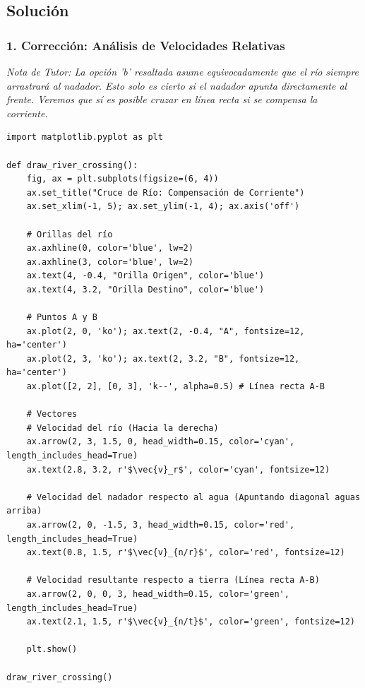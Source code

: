 \documentclass[12pt, a4paper]{article}
\begin{document}
\subsection*{Solución}

\subsubsection*{1. Corrección: Análisis de Velocidades Relativas}
\textit{Nota de Tutor: La opción 'b' resaltada asume equivocadamente que el río siempre arrastrará al nadador. Esto solo es cierto si el nadador apunta directamente al frente. Veremos que sí es posible cruzar en línea recta si se compensa la corriente.}

\begin{lstlisting}
import matplotlib.pyplot as plt

def draw_river_crossing():
    fig, ax = plt.subplots(figsize=(6, 4))
    ax.set_title("Cruce de Río: Compensación de Corriente")
    ax.set_xlim(-1, 5); ax.set_ylim(-1, 4); ax.axis('off')
    
    # Orillas del río
    ax.axhline(0, color='blue', lw=2)
    ax.axhline(3, color='blue', lw=2)
    ax.text(4, -0.4, "Orilla Origen", color='blue')
    ax.text(4, 3.2, "Orilla Destino", color='blue')
    
    # Puntos A y B
    ax.plot(2, 0, 'ko'); ax.text(2, -0.4, "A", fontsize=12, ha='center')
    ax.plot(2, 3, 'ko'); ax.text(2, 3.2, "B", fontsize=12, ha='center')
    ax.plot([2, 2], [0, 3], 'k--', alpha=0.5) # Línea recta A-B
    
    # Vectores
    # Velocidad del río (Hacia la derecha)
    ax.arrow(2, 3, 1.5, 0, head_width=0.15, color='cyan', length_includes_head=True)
    ax.text(2.8, 3.2, r'$\vec{v}_r$', color='cyan', fontsize=12)
    
    # Velocidad del nadador respecto al agua (Apuntando diagonal aguas arriba)
    ax.arrow(2, 0, -1.5, 3, head_width=0.15, color='red', length_includes_head=True)
    ax.text(0.8, 1.5, r'$\vec{v}_{n/r}$', color='red', fontsize=12)
    
    # Velocidad resultante respecto a tierra (Línea recta A-B)
    ax.arrow(2, 0, 0, 3, head_width=0.15, color='green', length_includes_head=True)
    ax.text(2.1, 1.5, r'$\vec{v}_{n/t}$', color='green', fontsize=12)

    plt.show()

draw_river_crossing()
\end{lstlisting}
\end{document}
